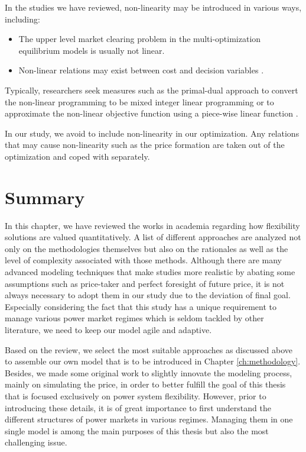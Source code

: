 In the studies we have reviewed, non-linearity may be introduced in various ways, including:
\begin{itemize}
	\item The upper level market clearing problem in the multi-optimization equilibrium models is usually not linear. \cite{He2012,Mohsenian-Rad2016,HenriquezAuba2017,Vespermann2017,Huang2017} 
	\item Non-linear relations may exist between cost and decision variables \cite{Mahmoudi2017}.
\end{itemize}

Typically, researchers seek measures such as the primal-dual approach to convert the non-linear programming to be mixed integer linear programming \cite{Zhang2016,Storage2015,HenriquezAuba2017,Mohsenian-Rad2016} or to approximate the non-linear objective function using a piece-wise linear function \cite{Mahmoudi2017}.

In our study, we avoid to include non-linearity in our optimization. Any relations that may cause non-linearity such as the price formation are taken out of the optimization and coped with separately.

\section{Summary}
In this chapter, we have reviewed the works in academia regarding how flexibility solutions are valued quantitatively. A list of different approaches are analyzed not only on the methodologies themselves but also on the rationales as well as the level of complexity associated with those methods. Although there are many advanced modeling techniques that make studies more realistic by abating some assumptions such as price-taker and perfect foresight of future price, it is not always necessary to adopt them in our study due to the deviation of final goal. Especially considering the fact that this study has a unique requirement to manage various power market regimes which is seldom tackled by other literature, we need to keep our model agile and adaptive. 

Based on the review, we select the most suitable approaches as discussed above to assemble our own model that is to be introduced in Chapter \ref{ch:methodology}. Besides, we made some original work to slightly innovate the modeling process, mainly on simulating the price, in order to better fulfill the goal of this thesis that is focused exclusively on power system flexibility. However, prior to introducing these details, it is of great importance to first understand the different structures of power markets in various regimes. Managing them in one single model is among the main purposes of this thesis but also the most challenging issue.


